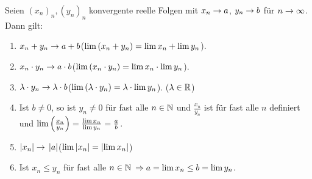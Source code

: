 \begin{satz}
    \label{satz:konvergenzsaetze}
    Seien $(x_n)_n, (y_n)_n$ konvergente reelle Folgen mit $x_n\rightarrow{} a$, $y_n\rightarrow{} b$ für $n\rightarrow{}\infty$. Dann gilt:
    \begin{enumerate}[label=(\alph*)]
        \item $x_n+y_n\rightarrow{} a+b$\quad ($\lim\left(x_n+y_n\right)=\lim x_n + \lim y_n$).
        \item $x_n\cdot y_n \rightarrow{} a\cdot b$\quad ($\lim\left(x_n\cdot y_n\right) = \lim x_n \cdot \lim y_n$).
        \item $\lambda\cdot y_n \rightarrow{} \lambda\cdot b$\quad ($\lim\left(\lambda\cdot y_n\right) = \lambda \cdot \lim y_n$). ($\lambda\in\mathbb{R}$)
        \item Ist $b\neq 0$, so ist $y_n \neq 0$ für fast alle $n\in\mathbb{N}$ und $\frac{x_n}{y_n}$ ist für fast alle $n$ definiert und $\lim\left(\frac{x_n}{y_n}\right) = \frac{\lim x_n}{\lim y_n} = \frac{a}{b}$.
        \item $\left\lvert x_n\right\rvert \rightarrow{} \left\lvert a\right\rvert$\quad ($\lim \left\lvert x_n\right\rvert = \left\lvert\lim x_n\right\rvert$)
        \item Ist $x_n \leq y_n$ für fast alle $n\in\mathbb{N}$ $\Rightarrow{} a = \lim x_n \leq b = \lim y_n$.
    \end{enumerate}


\end{satz}
